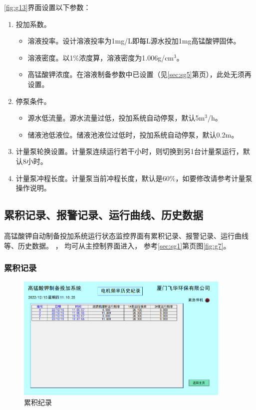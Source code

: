 \documentclass[UTF8,a4paper,12pt,titlepage]{ctexart}
\begin{document}
      \ref{fig:g13}界面设置以下参数：
      \begin{enumerate}
         \item 投加系数。
            \begin{itemize}
                \item 溶液投率。设计溶液投率为1mg/L即每L源水投加1mg高锰酸钾固体。
                \item 溶液密度。以1\%浓度算，溶液密度为1.006g/cm$^{3}$。
                \item 高锰酸钾浓度。在溶液制备参数中已设置（见\ref{sec:sg5}第\pageref{sec:sg5}页），此处无须再设置。
            \end{itemize}
         \item 停泵条件。
            \begin{itemize}
               \item 源水低流量。源水流量过低，投加系统自动停泵，默认5m$^{3}$/h。
               \item 储液池低液位。储液池液位过低时，投加系统自动停泵，默认0.2m。
            \end{itemize}
        \item 计量泵轮换设置。计量泵连续运行若干小时，则切换到另1台计量泵运行，默认8小时。
        \item 计量泵冲程长度。计量泵当前冲程长度，默认是60\%，如要修改请参考计量泵操作说明。
      \end{enumerate}

    \subsection{累积记录、报警记录、运行曲线、历史数据}
        高锰酸钾自动制备投加系统运行状态监控界面有累积记录、报警记录、运行曲线等、历史数据。
        ，
        均可从主控制界面进入，
        参考\ref{sec:sg1}第\pageref{sec:sg1}页图\ref{fig:g7}。

        \subsubsection{累积记录}
            \begin{figure}[h]
                \centering
                \includegraphics[height=6cm]{g11.png}
                \caption{累积纪录}\label{fig:g14}
            \end{figure}
            
\end{document}
